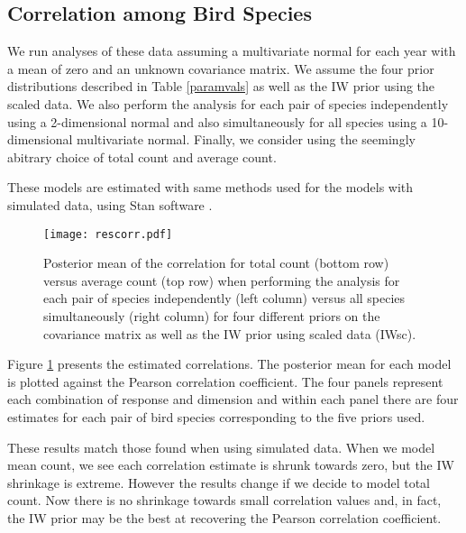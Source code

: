 \documentclass[12pt]{article}
\newcommand{\matt}[1]{\textcolor{red}{(matt: #1)}}
\begin{document}
\subsection{Correlation among Bird Species}

We run analyses of these data assuming a multivariate normal for each year with a mean of zero and an unknown covariance matrix. We assume the four prior distributions described in Table \ref{paramvals} as well as the IW prior using the scaled data. We also perform the analysis for each pair of species independently using a 2-dimensional normal and also simultaneously for all species using a 10-dimensional multivariate normal. Finally, we consider using the seemingly abitrary choice of total count and average count. 

These models are estimated with same methods used for the models with simulated data, using Stan software \citep{stan2014}. 

\begin{figure}[hbpt]
\centering
\texttt{[image: rescorr.pdf]}
 \vspace{-.5in}
\caption{Posterior mean of the correlation for total count (bottom row) versus average count (top row) when performing the analysis for each pair of species independently (left column) versus all species simultaneously (right column) for four different priors on the covariance matrix as well as the IW prior using scaled data (IWsc).}
\label{fig:coring}
\end{figure}
%

Figure \ref{fig:coring} presents the estimated correlations. The posterior mean for each model is plotted against the Pearson correlation coefficient. The four panels represent each combination of response and dimension and within each panel there are four estimates for each pair of bird species corresponding to the five priors used. 

These results match those found when using simulated data. When we model mean count, we see each correlation estimate is shrunk towards zero, but the IW shrinkage is extreme. However the results change if we decide to model total count. Now there is no shrinkage towards small correlation values and, in fact, the IW prior may be the best at recovering the Pearson correlation coefficient.
\end{document}
